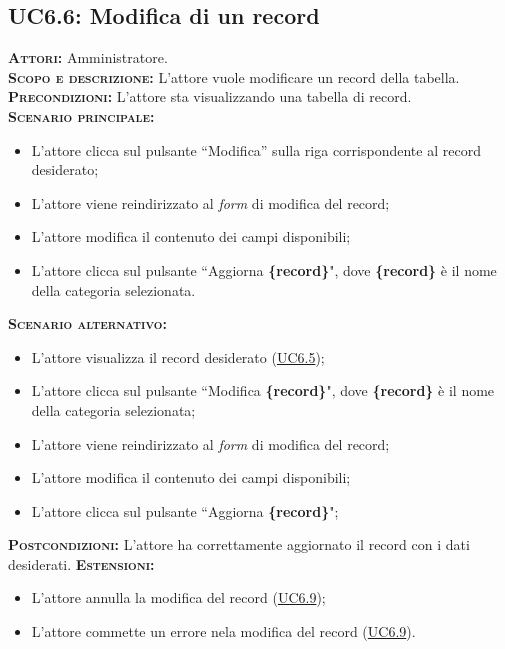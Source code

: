 \subsection{UC6.6: Modifica di un record}
\label{sec:UC66}
\textsc{\textbf{Attori:}} Amministratore.\\
\textsc{\textbf{Scopo e descrizione:}} L'attore vuole modificare un record della tabella.\\
\textsc{\textsc{\textbf{Precondizioni:}}} L'attore sta visualizzando una tabella di record.\\
\textsc{\textbf{Scenario principale:}}
\begin{itemize}
    \item L'attore clicca sul pulsante ``Modifica'' sulla riga corrispondente al record desiderato;
    \item L'attore viene reindirizzato al \textit{form} di modifica del record;
    \item L'attore modifica il contenuto dei campi disponibili;
    \item L'attore clicca sul pulsante ``Aggiorna \textbf{\{record\}}", dove \textbf{\{record\}} è il nome della categoria selezionata.
\end{itemize}
\textsc{\textbf{Scenario alternativo:}}
\begin{itemize}
    \item L'attore visualizza il record desiderato (\hyperref[sec:UC65]{UC6.5});
    \item L'attore clicca sul pulsante ``Modifica \textbf{\{record\}}", dove \textbf{\{record\}} è il nome della categoria selezionata;
    \item L'attore viene reindirizzato al \textit{form} di modifica del record;
    \item L'attore modifica il contenuto dei campi disponibili;
    \item L'attore clicca sul pulsante ``Aggiorna \textbf{\{record\}}";
\end{itemize}
\textsc{\textbf{Postcondizioni:}} L'attore ha correttamente aggiornato il record con i dati desiderati.
\textsc{\textbf{Estensioni:}} \begin{itemize}
    \item L'attore annulla la modifica del record (\hyperref[sec:UC69]{UC6.9});
    \item L'attore commette un errore nela modifica del record (\hyperref[sec:UC69]{UC6.9}).
\end{itemize}

